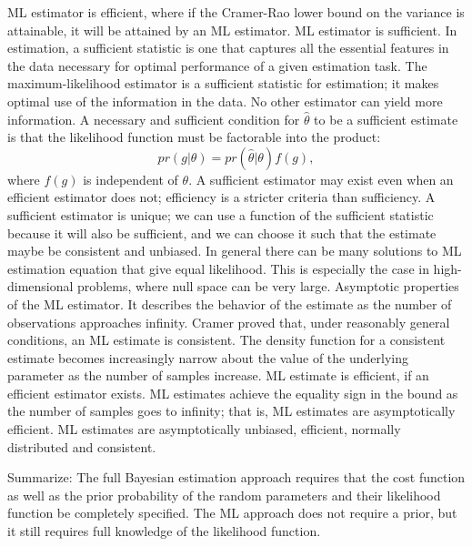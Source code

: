 ML estimator is efficient, where if the Cramer-Rao lower bound on the variance is attainable, it will be attained by an ML estimator.
ML estimator is sufficient.  In estimation, a sufficient statistic is one that captures all the essential features in the data necessary for optimal performance of a given estimation task.  The maximum-likelihood estimator is a sufficient statistic for estimation; it makes optimal use of the information in the data.  No other estimator can yield more information.  
A necessary and sufficient condition for $\hat{\theta}$ to be a sufficient estimate is that the likelihood function must be factorable into the product:
\begin{equation}
pr(g|\theta) = pr(\hat{\theta}|\theta) f(g),
\end{equation}
where $f(g)$ is independent of $\theta$.  
A sufficient estimator may exist even when an efficient estimator does not; efficiency is a stricter criteria than sufficiency.  A sufficient estimator is unique; we can use a function of the sufficient statistic because it will also be sufficient, and we can choose it such that the estimate maybe be consistent and unbiased.
In general there can be many solutions to ML estimation equation that give equal likelihood.  This is especially the case in high-dimensional problems, where null space can be very large.  
Asymptotic properties of the ML estimator.  It describes the behavior of the estimate as the number of observations approaches infinity.  Cramer proved that, under reasonably general conditions, an ML estimate is consistent.  The density function for a consistent estimate becomes increasingly narrow about the value of the underlying parameter as the number of samples increase.  ML estimate is efficient, if an efficient estimator exists.  ML estimates achieve the equality sign in the bound as the number of samples goes to infinity; that is, ML estimates are asymptotically efficient.
ML estimates are asymptotically unbiased, efficient, normally distributed and consistent.

Summarize: The full Bayesian estimation approach requires that the cost function as well as the prior probability of the random parameters and their likelihood function be completely specified. The ML approach does not require a prior, but it still requires full knowledge of the likelihood function. 

